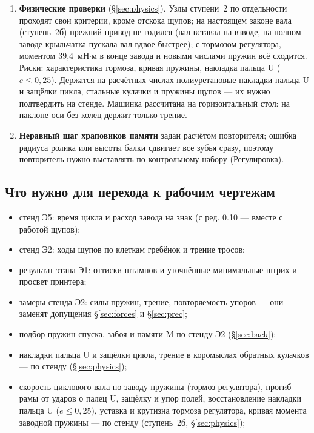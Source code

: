 \begin{enumerate}[label=Р\arabic*.]
  \item \textbf{Физические проверки} (\S\ref{sec:physics}). Узлы ступени~2 по отдельности проходят свои критерии, кроме отскока щупов; на настоящем законе вала (ступень~2б) прежний привод не годился (вал вставал на взводе, на полном заводе крыльчатка пускала вал вдвое быстрее); с тормозом регулятора, моментом 39,4~мН$\cdot$м в конце завода и новыми числами пружин всё сходится. Риски: характеристика тормоза, кривая пружины, накладка пальца U ($e \le 0{,}25$). Держатся на расчётных числах полиуретановые накладки пальца U и защёлки цикла, стальные кулачки и пружины щупов — их нужно подтвердить на стенде. Машинка рассчитана на горизонтальный стол: на наклоне оси без колец держит только трение.
  \item \textbf{Неравный шаг храповиков памяти} задан расчётом повторителя; ошибка радиуса ролика или высоты балки сдвигает все зубья сразу, поэтому повторитель нужно выставлять по контрольному набору (Регулировка).
\end{enumerate}
\endgroup

\subsection*{Что нужно для перехода к рабочим чертежам}

\begin{itemize}
  \item стенд Э5: время цикла и расход завода на знак (с ред. 0.10 — вместе с работой щупов);
  \item стенд Э2: ходы щупов по клеткам гребёнок и трение тросов;
  \item результат этапа Э1: оттиски штампов и уточнённые минимальные штрих и просвет принтера;
  \item замеры стенда Э2: силы пружин, трение, повторяемость упоров — они заменят допущения \S\ref{sec:forces} и \S\ref{sec:prec};
  \item подбор пружин спуска, забоя и памяти M по стенду Э2 (\S\ref{sec:back});
  \item накладки пальца U и защёлки цикла, трение в коромыслах обратных кулачков — по стенду (\S\ref{sec:physics});
  \item скорость циклового вала по заводу пружины (тормоз регулятора), прогиб рамы от ударов о палец U, защёлку и упор полей, восстановление накладки пальца U ($e \le 0{,}25$), уставка и крутизна тормоза регулятора, кривая момента заводной пружины — по стенду (ступень~2б, \S\ref{sec:physics});
  \end{itemize}

